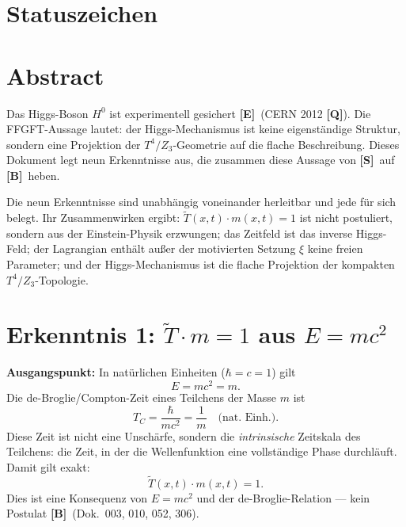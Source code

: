 \providecommand{\BM}{\textbf{[B]}}
\providecommand{\KM}{\textbf{[K]}}
\providecommand{\SM}{\textbf{[S]}}
\providecommand{\XM}{\textbf{[X]}}
\providecommand{\QM}{\textbf{[Q]}}

{}

\section*{Statuszeichen}


\section*{Abstract}

Das Higgs-Boson $H^0$ ist experimentell gesichert \textbf{[E]}\ (CERN 2012 \QM).
Die FFGFT-Aussage lautet: der Higgs-Mechanismus ist keine eigenständige Struktur,
sondern eine Projektion der $T^4/Z_3$-Geometrie auf die flache Beschreibung.
Dieses Dokument legt neun Erkenntnisse aus, die zusammen diese Aussage von
\SM\ auf \BM\ heben.

Die neun Erkenntnisse sind unabhängig voneinander herleitbar und jede
für sich belegt. Ihr Zusammenwirken ergibt: $\tilde{T}(x,t)\cdot m(x,t) = 1$
ist nicht postuliert, sondern aus der Einstein-Physik erzwungen; das Zeitfeld
ist das inverse Higgs-Feld; der Lagrangian enthält außer der motivierten
Setzung $\xi$ keine freien Parameter; und der Higgs-Mechanismus ist die flache Projektion der kompakten
$T^4/Z_3$-Topologie.

\section{Erkenntnis 1: $\tilde{T}\cdot m = 1$ aus $E = mc^2$}

\textbf{Ausgangspunkt:} In natürlichen Einheiten ($\hbar = c = 1$) gilt
\begin{equation}
  E = mc^2 = m.
  \label{eq:Emc2}
\end{equation}
Die de-Broglie/Compton-Zeit eines Teilchens der Masse $m$ ist
\begin{equation}
  T_C = \frac{\hbar}{mc^2} = \frac{1}{m}
  \quad\text{(nat.\ Einh.)}.
  \label{eq:compton}
\end{equation}
Diese Zeit ist nicht eine Unschärfe, sondern die \emph{intrinsische} Zeitskala
des Teilchens: die Zeit, in der die Wellenfunktion eine vollständige Phase
durchläuft. Damit gilt exakt:
\begin{equation}
  \boxed{\tilde{T}(x,t)\cdot m(x,t) = 1.}
  \label{eq:duality}
\end{equation}
Dies ist eine Konsequenz von $E = mc^2$ und der de-Broglie-Relation ---
kein Postulat \BM\ (Dok.~003, 010, 052, 306).

